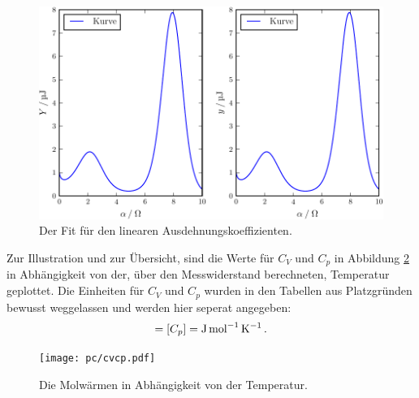 \begin{figure}
  \centering
  \includegraphics[width=\textwidth]{pc/Plot.pdf}
  \caption{Der Fit für den linearen Ausdehnungskoeffizienten.}
  \label{fig:a}
\end{figure}
Zur Illustration und zur Übersicht, sind die Werte für $C_V$ und $C_p$ in Abbildung \ref{fig:cvcp} in Abhängigkeit von der, über den Messwiderstand berechneten, Temperatur geplottet. Die Einheiten für $C_V$ und $C_p$ wurden in den Tabellen aus Platzgründen bewusst weggelassen und werden hier seperat angegeben:
\begin{equation*}
	[C_V] = [C_p] = \si{\joule\per\mole\per\kelvin}\,\text.
\end{equation*}



\begin{figure}
	\centering
	\texttt{[image: pc/cvcp.pdf]}
	\caption{Die Molwärmen in Abhängigkeit von der Temperatur.}
	\label{fig:cvcp}
\end{figure}

